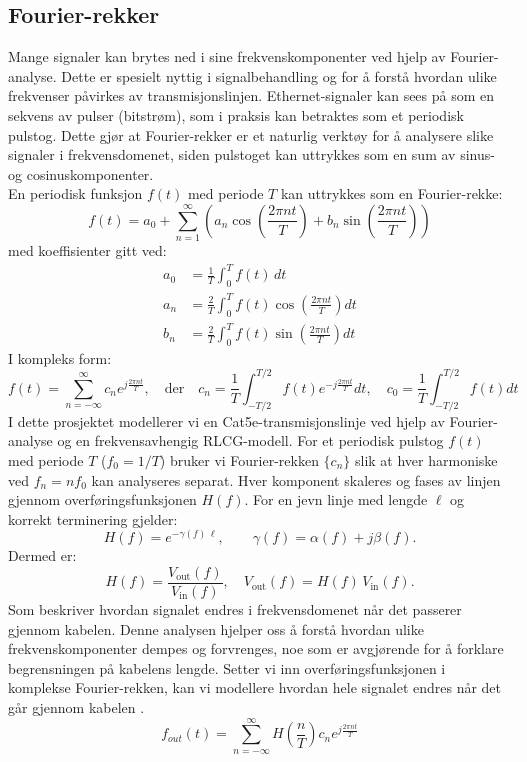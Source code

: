 \subsection{Fourier-rekker}

Mange signaler kan brytes ned i sine frekvenskomponenter ved hjelp av Fourier-analyse. Dette er spesielt nyttig i signalbehandling og for å forstå hvordan ulike frekvenser påvirkes av transmisjonslinjen. Ethernet-signaler kan sees på som en sekvens av pulser (bitstrøm), som i praksis kan betraktes som et periodisk pulstog. Dette gjør at Fourier-rekker er et naturlig verktøy for å analysere slike signaler i frekvensdomenet, siden pulstoget kan uttrykkes som en sum av sinus- og cosinuskomponenter.\\[1em]
En periodisk funksjon $f(t)$ med periode $T$ kan uttrykkes som en Fourier-rekke:
\begin{equation}
f(t) = a_0 + \sum_{n=1}^{\infty} \left( a_n \cos\left(\frac{2\pi n t}{T}\right) + b_n \sin\left(\frac{2\pi n t}{T}\right) \right)
\end{equation}
med koeffisienter gitt ved:
\begin{align*}
a_0 &= \frac{1}{T} \int_{0}^{T} f(t) \, dt \\
a_n &= \frac{2}{T} \int_{0}^{T} f(t) \cos\left(\frac{2\pi n t}{T}\right) dt \\
b_n &= \frac{2}{T} \int_{0}^{T} f(t) \sin\left(\frac{2\pi n t}{T}\right) dt
\end{align*}
I kompleks form:
\begin{equation}
f(t) = \sum_{n=-\infty}^{\infty} c_n e^{j \frac{2\pi n t}{T}}, \quad \text{der} \quad c_n = \frac{1}{T} \int_{-T/2}^{T/2} f(t) e^{-j \frac{2\pi n t}{T}} dt, \quad c_0 = \frac{1}{T} \int_{-T/2}^{T/2} f(t) dt
\end{equation}
I dette prosjektet modellerer vi en Cat5e-transmisjonslinje ved hjelp av Fourier-analyse
og en frekvensavhengig RLCG-modell. For et periodisk pulstog \(f(t)\) med periode \(T\)
(\(f_0=1/T\)) bruker vi Fourier-rekken \(\{c_n\}\) slik at hver harmoniske ved
\(f_n=nf_0\) kan analyseres separat. Hver komponent skaleres og fases av linjen gjennom
overføringsfunksjonen \(H(f)\). For en jevn linje med lengde \(\ell\) og korrekt terminering
gjelder:
\[
H(f)=e^{-\gamma(f)\,\ell},\qquad \gamma(f)=\alpha(f)+j\beta(f).
\]
Dermed er:
\[
H(f)=\frac{V_{\text{out}}(f)}{V_{\text{in}}(f)},\quad
V_{\text{out}}(f)=H(f)\,V_{\text{in}}(f).
\]
Som beskriver hvordan signalet endres i frekvensdomenet når det passerer gjennom kabelen.
Denne analysen hjelper oss å forstå hvordan ulike frekvenskomponenter dempes og forvrenges, noe som er avgjørende for å forklare begrensningen på kabelens lengde.
Setter vi inn overføringsfunksjonen i komplekse Fourier-rekken, kan vi modellere hvordan hele signalet endres når det går gjennom kabelen \cite{engineering_mathematics}.
\begin{equation}
    f_{out}(t) = \sum_{n=-\infty}^{\infty} H\left(\frac{n}{T}\right) c_n e^{j \frac{2\pi n t}{T}}
\end{equation}
\clearpage

